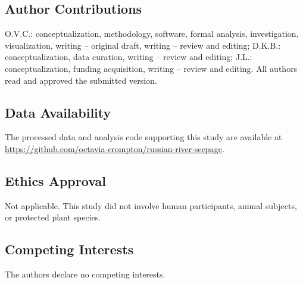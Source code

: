 \documentclass[preprint,12pt,authoryear]{elsarticle}
\begin{document}
\subsection*{Author Contributions}
O.V.C.: conceptualization, methodology, software, formal analysis, investigation, visualization, writing -- original draft, writing -- review and editing; D.K.B.: conceptualization, data curation, writing -- review and editing; J.L.: conceptualization, funding acquisition, writing -- review and editing. All authors read and approved the submitted version.

\subsection*{Data Availability}
The processed data and analysis code supporting this study are available at \url{https://github.com/octavia-crompton/russian-river-seepage}.

\subsection*{Ethics Approval}
Not applicable. This study did not involve human participants, animal subjects, or protected plant species.

\subsection*{Competing Interests}
The authors declare no competing interests.




 
 
\end{document}
